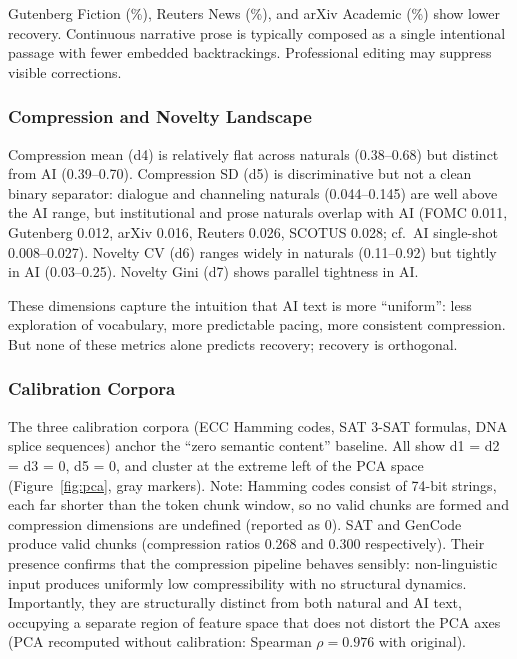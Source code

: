 \documentclass[final]{clv2025}
\begin{document}
Gutenberg Fiction (\recFiction\%), Reuters News (\recNews\%), and arXiv Academic (\recAcademic\%) show lower recovery. Continuous narrative prose is typically composed as a single intentional passage with fewer embedded backtrackings. Professional editing may suppress visible corrections.

\subsubsection{Compression and Novelty Landscape}

Compression mean (d4) is relatively flat across naturals (0.38--0.68) but distinct from AI (0.39--0.70). Compression SD (d5) is discriminative but not a clean binary separator: dialogue and channeling naturals (0.044--0.145) are well above the AI range, but institutional and prose naturals overlap with AI (FOMC 0.011, Gutenberg 0.012, arXiv 0.016, Reuters 0.026, SCOTUS 0.028; cf.\ AI single-shot 0.008--0.027). Novelty CV (d6) ranges widely in naturals (0.11--0.92) but tightly in AI (0.03--0.25). Novelty Gini (d7) shows parallel tightness in AI.

These dimensions capture the intuition that AI text is more ``uniform'': less exploration of vocabulary, more predictable pacing, more consistent compression. But none of these metrics alone predicts recovery; recovery is orthogonal.

\subsubsection{Calibration Corpora}

The three calibration corpora (ECC Hamming codes, SAT 3-SAT formulas, DNA splice sequences) anchor the ``zero semantic content'' baseline. All show d1 = d2 = d3 = 0, d5 = 0, and cluster at the extreme left of the PCA space (Figure~\ref{fig:pca}, gray markers). Note: Hamming codes consist of 74-bit strings, each far shorter than the \chunkTokens\-token chunk window, so no valid chunks are formed and compression dimensions are undefined (reported as 0). SAT and GenCode produce valid chunks (compression ratios 0.268 and 0.300 respectively). Their presence confirms that the compression pipeline behaves sensibly: non-linguistic input produces uniformly low compressibility with no structural dynamics. Importantly, they are structurally distinct from both natural and AI text, occupying a separate region of feature space that does not distort the PCA axes (PCA recomputed without calibration: Spearman $\rho = 0.976$ with original).
\end{document}
